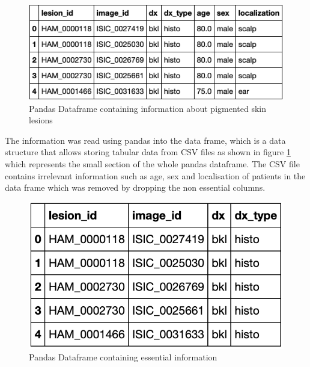 \begin{figure} [!htp]
    \includegraphics[width=\textwidth]{Images/datae.png}
    \caption{Pandas Dataframe containing information about pigmented skin lesions}
    \label{fig:pandasTop}
\end{figure}

The information was read using pandas into the data frame, 
which is a data structure that allows storing tabular data from CSV files as shown in 
figure \ref{fig:pandasTop} which represents the small section of the whole pandas dataframe. The CSV file contains irrelevant information such as age, sex and localisation 
of patients in the data frame which was removed by dropping the non essential columns.

\begin{figure} [!htp]
    \includegraphics[width=\textwidth]{Images/datee.png}
    \caption{Pandas Dataframe containing essential information}
    \label{fig:pandasdrop}
\end{figure}

